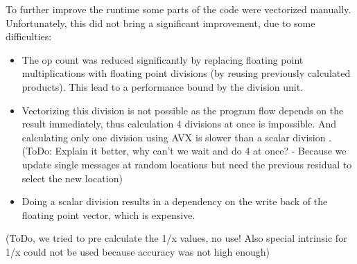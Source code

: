 To further improve the runtime some parts of the code were vectorized manually. Unfortunately, this did not bring a significant improvement, due to some difficulties:
\begin{itemize}
	\item The op count was reduced significantly by replacing floating point multiplications with floating point divisions (by reusing previously calculated products). This lead to a performance bound by the division unit.
	\item Vectorizing this division is not possible as the program flow depends on the result immediately, thus calculation 4 divisions at once is impossible. And calculating only one division using AVX is slower than a scalar division \cite{intrinsics_guide}. (ToDo: Explain it better, why can't we wait and do 4 at once? - Because we update single messages at random locations but need the previous residual to select the new location)
	\item Doing a scalar division results in a dependency on the write back of the floating point vector, which is expensive.
\end{itemize}
(ToDo, we tried to pre calculate the 1/x values, no use! Also special intrinsic for 1/x could not be used because accuracy was not high enough)
